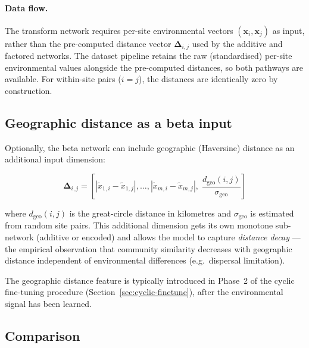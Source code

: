 \documentclass{article}
\begin{document}
\paragraph{Data flow.}
The transform network requires per-site environmental vectors $(\mathbf{x}_i, \mathbf{x}_j)$ as input, rather than the pre-computed distance vector $\bm{\Delta}_{i,j}$ used by the additive and factored networks. The dataset pipeline retains the raw (standardised) per-site environmental values alongside the pre-computed distances, so both pathways are available. For within-site pairs ($i = j$), the distances are identically zero by construction.

\subsection{Geographic distance as a beta input}

Optionally, the beta network can include geographic (Haversine) distance as an additional input dimension:

\begin{equation}
    \bm{\Delta}_{i,j} = \left[|\tilde{x}_{1,i} - \tilde{x}_{1,j}|, \ldots, |\tilde{x}_{m,i} - \tilde{x}_{m,j}|, \; \frac{d_{\text{geo}}(i,j)}{\sigma_{\text{geo}}}\right]
\end{equation}

where $d_{\text{geo}}(i,j)$ is the great-circle distance in kilometres and $\sigma_{\text{geo}}$ is estimated from random site pairs. This additional dimension gets its own monotone sub-network (additive or encoded) and allows the model to capture \textit{distance decay} --- the empirical observation that community similarity decreases with geographic distance independent of environmental differences (e.g.\ dispersal limitation).

The geographic distance feature is typically introduced in Phase~2 of the cyclic fine-tuning procedure (Section~\ref{sec:cyclic-finetune}), after the environmental signal has been learned.

\subsection{Comparison}
\end{document}
